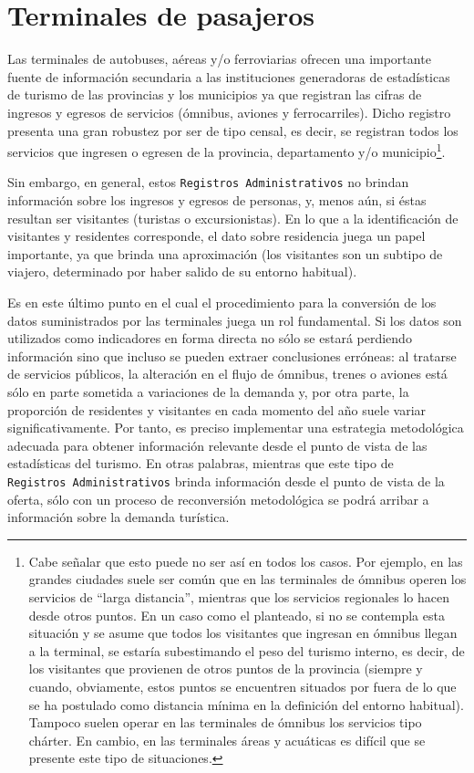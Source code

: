 \documentclass[
]{book}
\begin{document}
\hypertarget{terminales-de-pasajeros}{%
\section{Terminales de pasajeros}\label{terminales-de-pasajeros}}

\hfill\break
Las terminales de autobuses, aéreas y/o ferroviarias ofrecen una importante fuente de información secundaria a las instituciones generadoras de estadísticas de turismo de las provincias y los municipios ya que registran las cifras de ingresos y egresos de servicios (ómnibus, aviones y ferrocarriles). Dicho registro presenta una gran robustez por ser de tipo censal, es decir, se registran todos los servicios que ingresen o egresen de la provincia, departamento y/o municipio\footnote{Cabe señalar que esto puede no ser así en todos los casos. Por ejemplo, en las grandes ciudades suele ser común que en las terminales de ómnibus operen los servicios de ``larga distancia'', mientras que los servicios regionales lo hacen desde otros puntos. En un caso como el planteado, si no se contempla esta situación y se asume que todos los visitantes que ingresan en ómnibus llegan a la terminal, se estaría subestimando el peso del turismo interno, es decir, de los visitantes que provienen de otros puntos de la provincia (siempre y cuando, obviamente, estos puntos se encuentren situados por fuera de lo que se ha postulado como distancia mínima en la definición del entorno habitual). Tampoco suelen operar en las terminales de ómnibus los servicios tipo chárter. En cambio, en las terminales áreas y acuáticas es difícil que se presente este tipo de situaciones.

  \hfill\break
}.

Sin embargo, en general, estos \texttt{Registros\ Administrativos} no brindan información sobre los ingresos y egresos de personas, y, menos aún, si éstas resultan ser visitantes (turistas o excursionistas). En lo que a la identificación de visitantes y residentes corresponde, el dato sobre residencia juega un papel importante, ya que brinda una aproximación (los visitantes son un subtipo de viajero, determinado por haber salido de su entorno habitual).

Es en este último punto en el cual el procedimiento para la conversión de los datos suministrados por las terminales juega un rol fundamental. Si los datos son utilizados como indicadores en forma directa no sólo se estará perdiendo información sino que incluso se pueden extraer conclusiones erróneas: al tratarse de servicios públicos, la alteración en el flujo de ómnibus, trenes o aviones está sólo en parte sometida a variaciones de la demanda y, por otra parte, la proporción de residentes y visitantes en cada momento del año suele variar significativamente. Por tanto, es preciso implementar una estrategia metodológica adecuada para obtener información relevante desde el punto de vista de las estadísticas del turismo. En otras palabras, mientras que este tipo de \texttt{Registros\ Administrativos} brinda información desde el punto de vista de la oferta, sólo con un proceso de reconversión metodológica se podrá arribar a información sobre la demanda turística.
\end{document}
